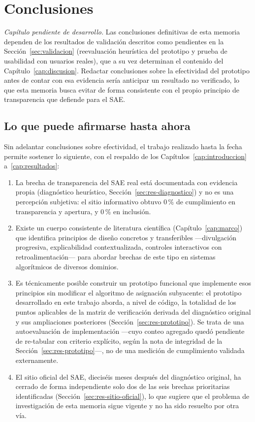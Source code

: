 \chapter{Conclusiones}\label{cap:conclusiones}

\emph{Capítulo pendiente de desarrollo.} Las conclusiones definitivas de esta memoria dependen de los resultados de validación descritos como pendientes en la Sección~\ref{sec:validacion} (reevaluación heurística del prototipo y prueba de usabilidad con usuarios reales), que a su vez determinan el contenido del Capítulo~\ref{cap:discusion}. Redactar conclusiones sobre la efectividad del prototipo antes de contar con esa evidencia sería anticipar un resultado no verificado, lo que esta memoria busca evitar de forma consistente con el propio principio de transparencia que defiende para el SAE.

\section*{Lo que puede afirmarse hasta ahora}

Sin adelantar conclusiones sobre efectividad, el trabajo realizado hasta la fecha permite sostener lo siguiente, con el respaldo de los Capítulos~\ref{cap:introduccion} a~\ref{cap:resultados}:

\begin{enumerate}
    \item La brecha de transparencia del SAE real está documentada con evidencia propia (diagnóstico heurístico, Sección~\ref{sec:res-diagnostico}) y no es una percepción subjetiva: el sitio informativo obtuvo 0\,\% de cumplimiento en transparencia y apertura, y 0\,\% en inclusión.
    \item Existe un cuerpo consistente de literatura científica (Capítulo~\ref{cap:marco}) que identifica principios de diseño concretos y transferibles —divulgación progresiva, explicabilidad contextualizada, controles interactivos con retroalimentación— para abordar brechas de este tipo en sistemas algorítmicos de diversos dominios.
    \item Es técnicamente posible construir un prototipo funcional que implemente esos principios sin modificar el algoritmo de asignación subyacente: el prototipo desarrollado en este trabajo aborda, a nivel de código, la totalidad de los puntos aplicables de la matriz de verificación derivada del diagnóstico original y sus ampliaciones posteriores (Sección~\ref{sec:res-prototipo}). Se trata de una autoevaluación de implementación —cuyo conteo agregado quedó pendiente de re-tabular con criterio explícito, según la nota de integridad de la Sección~\ref{sec:res-prototipo}—, no de una medición de cumplimiento validada externamente.
    \item El sitio oficial del SAE, dieciséis meses después del diagnóstico original, ha cerrado de forma independiente solo dos de las seis brechas prioritarias identificadas (Sección~\ref{sec:res-sitio-oficial}), lo que sugiere que el problema de investigación de esta memoria sigue vigente y no ha sido resuelto por otra vía.
\end{enumerate}

